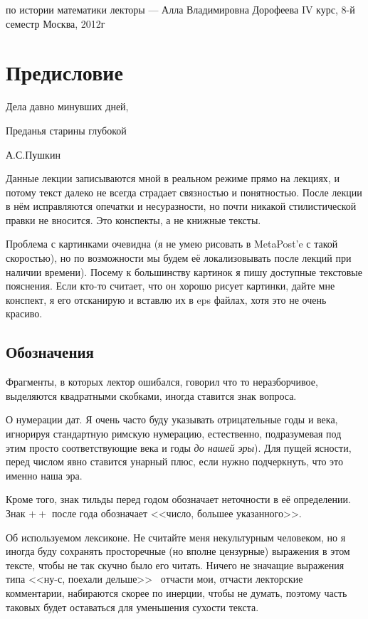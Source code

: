 \documentclass[a4paper,oneside,fleqn,10pt]{article}
\begin{document}
\dmvnhistinitialize
{}
          {по истории математики}
          {лекторы --- Алла Владимировна Дорофеева}
          {IV курс, 8-й семестр}
          {Москва, 2012г}
\section*{Предисловие}
\epigraph{Дела давно минувших дней,
  \par Преданья старины глубокой}{А.С.Пушкин}

Данные лекции записываются мной в реальном режиме прямо на лекциях,
и потому текст далеко не всегда страдает связностью и понятностью.
После лекции в нём исправляются опечатки и несуразности, но почти
никакой стилистической правки не вносится. Это конспекты, а не
книжные тексты.

Проблема с картинками очевидна (я не умею рисовать в MetaPost'e с такой скоростью),
но по возможности мы будем её локализовывать после лекций при наличии времени).
Посему к большинству картинок я пишу доступные текстовые пояснения.
Если кто-то считает, что он хорошо рисует картинки, дайте мне конспект, я его
отсканирую и вставлю их в eps файлах, хотя это не очень красиво.

\subsection*{Обозначения}

Фрагменты, в которых лектор ошибался, говорил что то неразборчивое,
выделяются квадратными скобками, иногда ставится знак вопроса.

О нумерации дат. Я очень часто буду указывать отрицательные годы и века,
игнорируя стандартную римскую нумерацию, естественно, подразумевая под
этим просто соответствующие века и годы \emph{до нашей эры}).
Для пущей ясности, перед числом явно ставится унарный плюс, если нужно подчеркнуть,
что это именно наша эра.

Кроме того, знак тильды перед годом обозначает неточности в её определении.
Знак ${+}{+}$ после года обозначает <<число, большее указанного>>.

Об используемом лексиконе. Не считайте меня некультурным человеком, но я иногда буду
сохранять просторечные (но вполне цензурные) выражения в этом тексте, чтобы не так скучно
было его читать. Ничего не значащие выражения типа <<ну-с, поехали дельше>>~ отчасти
мои, отчасти лекторские комментарии, набираются скорее по инерции, чтобы не думать,
поэтому часть таковых будет оставаться для уменьшения сухости текста.
\end{document}
